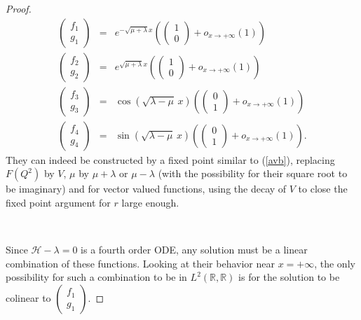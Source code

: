 \documentclass[11 pt]{amsart}
\theoremstyle{definition}
\theoremstyle{remark}
\numberwithin{equation}{section}
\begin{document}
\begin{proof}
  \begin{eqnarray*}
    \left(\begin{array}{c}
      f_1\\
      g_1
    \end{array}\right) & = & e^{-\sqrt{\mu + \lambda } x}\left( \left(\begin{array}{c}
       1\\
       0
     \end{array}\right) + o_{x \rightarrow + \infty} (1) \right)\\
    \left(\begin{array}{c}
      f_2\\
      g_2
    \end{array}\right) & = & e^{\sqrt{\mu +  \lambda} x} \left( \left(\begin{array}{c}
       1\\
       0
     \end{array}\right) + o_{x \rightarrow + \infty} (1) \right)\\
    \left(\begin{array}{c}
      f_3\\
      g_3
    \end{array}\right) & = & \cos \left( \sqrt{ \lambda - \mu }\, x
    \right)\left( \left(\begin{array}{c}
       0\\
       1
     \end{array}\right) + o_{x \rightarrow + \infty} (1) \right)\\
    \left(\begin{array}{c}
      f_4\\
      g_4
    \end{array}\right) & = & \sin \left( \sqrt{ \lambda - \mu }\, x
    \right)\left( \left(\begin{array}{c}
       0\\
       1
     \end{array}\right) + o_{x \rightarrow + \infty} (1) \right) .
  \end{eqnarray*}
  They can indeed be constructed by a fixed point similar to (\ref{avb}), replacing $F(Q^2)$ by $V$, $\mu$ by $\mu+\lambda$ or $\mu-\lambda$ (with the possibility for their square root to be imaginary) and for vector valued functions, using the decay of $V$ to close the fixed point argument for $r$ large enough.

\
  
  Since $\mathcal{H}- \lambda = 0$ is a fourth order ODE,
  any solution must be a linear combination of these functions. Looking at
  their behavior near $x = + \infty$, the only possibility for such a
  combination to be in $L^2 (\mathbb{R}, \mathbb{R})$ is for
  the solution to be colinear to $\left(\begin{array}{c}
    f_1\\
    g_1
  \end{array}\right)$.
  

\end{proof}
\end{document}
